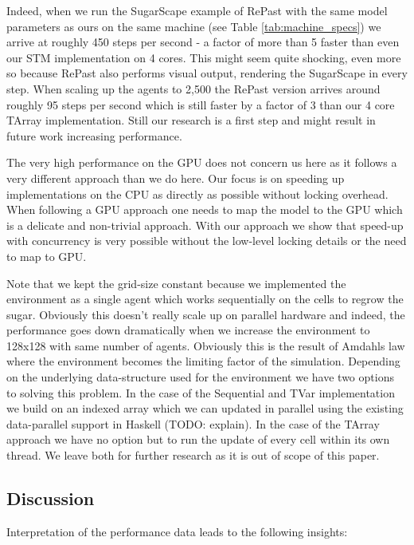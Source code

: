 Indeed, when we run the SugarScape example of RePast with the same model parameters as ours on the same machine (see Table \ref{tab:machine_specs}) we arrive at roughly 450 steps per second - a factor of more than 5 faster than even our STM implementation on 4 cores. This might seem quite shocking, even more so because RePast also performs visual output, rendering the SugarScape in every step. When scaling up the agents to 2,500 the RePast version arrives around roughly 95 steps per second which is still faster by a factor of 3 than our 4 core TArray implementation. Still our research is a first step and might result in future work increasing performance.

The very high performance on the GPU does not concern us here as it follows a very different approach than we do here. Our focus is on speeding up implementations on the CPU as directly as possible without locking overhead. When following a GPU approach one needs to map the model to the GPU which is a delicate and non-trivial approach. With our approach we show that speed-up with concurrency is very possible without the low-level locking details or the need to map to GPU.

Note that we kept the grid-size constant because we implemented the environment as a single agent which works sequentially on the cells to regrow the sugar. Obviously this doesn't really scale up on parallel hardware and indeed, the performance goes down dramatically when we increase the environment to 128x128 with same number of agents. Obviously this is the result of Amdahls law where the environment becomes the limiting factor of the simulation. Depending on the underlying data-structure used for the environment we have two options to solving this problem. In the case of the Sequential and TVar implementation we build on an indexed array which we can updated in parallel using the existing data-parallel support in Haskell (TODO: explain). In the case of the TArray approach we have no option but to run the update of every cell within its own thread. We leave both for further research as it is out of scope of this paper. 

\subsection{Discussion}
Interpretation of the performance data leads to the following insights:

